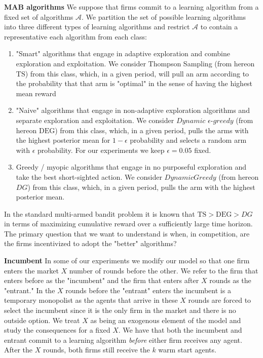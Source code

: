 \documentclass[letterpaper]{article}
\theoremstyle{definition}
\newcommand{\TS}{\mathrm{TS}}
\newcommand{\DEG}{\mathrm{DEG}}
\begin{document}
\noindent \textbf{MAB algorithms} We suppose that firms commit to a learning algorithm from a fixed set of algorithms $\mathcal{A}$. We partition the set of possible learning algorithms into three different types of learning algorithms and restrict $\mathcal{A}$ to contain a representative each algorithm from each class:
\begin{enumerate}
\item "Smart" algorithms that engage in adaptive exploration and combine exploration and exploitation. We consider Thompson Sampling (from hereon $\TS$) from this class, which, in a given period, will pull an arm according to the probability that that arm is "optimal" in the sense of having the highest mean reward %
\item "Naive" algorithms that engage in non-adaptive exploration algorithms and separate exploration and exploitation. We consider $Dynamic$ $\epsilon$-$greedy$ (from hereon $\DEG$) from this class, which, in a given period, pulls the arms with the highest posterior mean for $1 - \epsilon$ probability and selects a random arm with $\epsilon$ probability. For our experiments we keep $\epsilon = 0.05$ fixed.
\item Greedy / myopic algorithms that engage in no purposeful exploration and take the best short-sighted action. We consider $DynamicGreedy$ (from hereon $DG$) from this class, which, in a given period, pulls the arm with the highest posterior mean.
\end{enumerate}

In the standard multi-armed bandit problem it is known that $\TS > \DEG > DG$ in terms of maximizing cumulative reward over a sufficiently large time horizon. The primary question that we want to understand is when, in competition, are the firms incentivized to adopt the "better" algorithms?

\noindent \textbf{Incumbent} In some of our experiments we modify our model so that one firm enters the market $X$ number of rounds before the other. We refer to the firm that enters before as the "incumbent" and the firm that enters after $X$ rounds as the "entrant." In the $X$ rounds before the "entrant" enters the incumbent is a temporary monopolist as the agents that arrive in these $X$ rounds are forced to select the incumbent since it is the only firm in the market and there is no outside option. We treat $X$ as being an exogenous element of the model and study the consequences for a fixed $X$. We have that both the incumbent and entrant commit to a learning algorithm \textit{before} either firm receives any agent. After the $X$ rounds, both firms still receive the $k$ warm start agents.
\end{document}
